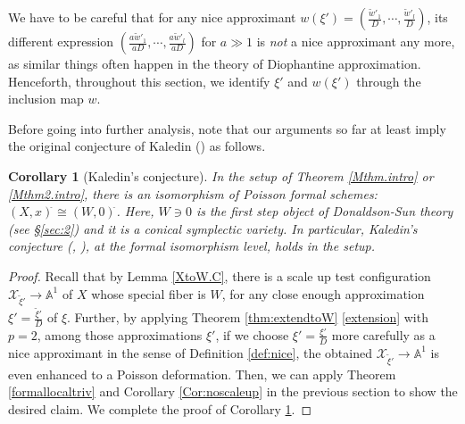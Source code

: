 \documentclass[12pt,a4paper]{amsart}
\newtheorem{Cor}[Thm]{Corollary}
\theoremstyle{remark}
\theoremstyle{definition}
\def\A{\mathbb{A}}
\begin{document}
We have to be careful that for any nice approximant 
$w(\xi')=(\frac{\tilde{w}'_1}{D},\cdots,\frac{\tilde{w}'_l}{D})$, its different expression 
$(\frac{a\tilde{w}'_1}{aD},\cdots,\frac{a\tilde{w}'_l}{aD})$
for $a\gg 1$ is {\it not} a nice approximant any more, as 
similar things often happen in the theory of Diophantine 
approximation. 
Henceforth, throughout this section, we identify $\xi'$ and 
$w(\xi')$ through the inclusion map $w$. 

\vspace{5mm}

Before going into further analysis, note that 
our arguments so far at least imply the original conjecture of 
Kaledin (\cite{Kaledin, Kaledin 2}) as follows. 

\begin{Cor}[Kaledin's conjecture]\label{formal.isom}
In the setup of Theorem \ref{Mthm.intro} or \ref{Mthm2.intro}, 
there is an isomorphism of Poisson formal schemes: 
$(X, x)^{\hat{}}  \cong  (W, 0)^{\hat{}}$. 
Here, $W\ni 0$ is the first step object of 
Donaldson-Sun theory (see \S \ref{sec:2}) and it is a 
conical symplectic variety. In particular, 
Kaledin's conjecture (\cite[cf., Remark 4.2, \S 4]{Kaledin}, \cite[Conjecture 1.8]{Kaledin 2}), at the formal isomorphism level, 
holds in the setup. 
\end{Cor}


\begin{proof}
Recall that by Lemma \ref{XtoW.C}, there is a scale up test configuration 
$\mathcal{X}_{\tilde{\xi}'}\to \A^1$
of 
$X$ whose special fiber is $W$, for 
any close enough approximation $\xi'=\frac{\tilde{\xi}'}{D}$ 
of $\xi$. Further, by applying 
Theorem \ref{thm:extendtoW} \eqref{extension} with $p=2$, 
among those  approximations $\xi'$, 
if we choose $\xi'=\frac{\xi'}
{D}$ more carefully as a nice approximant in the sense of 
Definition \ref{def:nice}, the obtained $\mathcal{X}_{\tilde{\xi}'}\to \A^1$ is even 
enhanced to a Poisson deformation. Then, we can apply 
Theorem \ref{formallocaltriv} and Corollary \ref{Cor:noscaleup} 
in the previous section to show the desired 
claim. We complete the proof of Corollary \ref{formal.isom}. 
\end{proof}
\end{document}
